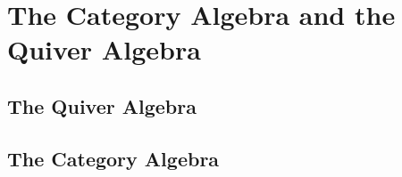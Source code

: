 
\section{The Category Algebra and the Quiver Algebra}

\subsection{The Quiver Algebra}

\subsection{The Category Algebra}